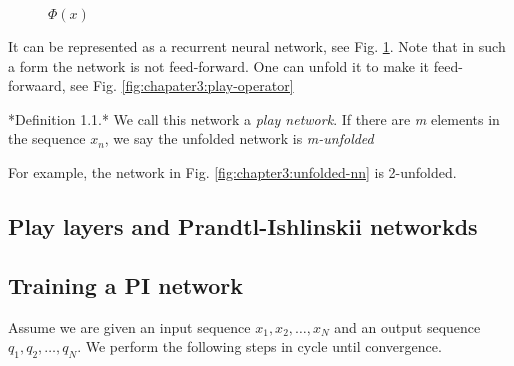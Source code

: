 \begin{figure}[htb]
  \centering
  \resizebox{8cm}{!}{}
  \caption{$\Phi(x)$}\label{fig:chapter3:phi}
\end{figure}

It can be represented as a recurrent neural network, see Fig. \ref{fig:chapter3:phi}. Note that in such a form the network is not feed-forward.
One can unfold it to make it feed-forwaard, see Fig. \ref{fig:chapater3:play-operator}

*Definition 1.1.* We call this network a \textsl{play network}. If there are \textsl{m} elements in the sequence ${x_n}$, we say the unfolded network is \textsl{m-unfolded}

For example, the network in Fig. \ref{fig:chapter3:unfolded-nn} is 2-unfolded.


\subsection{Play layers and Prandtl-Ishlinskii networkds\label{sec:chapter3:play-layers-and-pi-networks}}

\subsection{Training a PI network\label{sec:chapter3:training-pi-network}}
Assume we are given an input sequence $x_1, x_2, \ldots, x_N$ and an output sequence $q_1, q_2, \ldots, q_N$. We perform the following steps in cycle until convergence.

